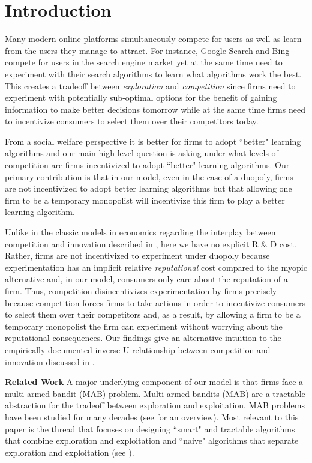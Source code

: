 \documentclass{article}
\theoremstyle{definition}
\begin{document}
\section{Introduction}
\label{S:1}

Many modern online platforms simultaneously compete for users as well as learn from the users they manage to attract. For instance, Google Search and Bing compete for users in the search engine market yet at the same time need to experiment with their search algorithms to learn what algorithms work the best. This creates a tradeoff between \textit{exploration} and \textit{competition} since firms need to experiment with potentially sub-optimal options for the benefit of gaining information to make better decisions tomorrow while at the same time firms need to incentivize consumers to select them over their competitors today.

From a social welfare perspective it is better for firms to adopt ``better" learning algorithms and our main high-level question is asking under what levels of competition are firms incentivized to adopt ``better" learning algorithms. Our primary contribution is that in our model, even in the case of a duopoly, firms are not incentivized to adopt better learning algorithms but that allowing one firm to be a temporary monopolist will incentivize this firm to play a better learning algorithm. 

Unlike in the classic models in economics regarding the interplay between competition and innovation described in \citet{barro2004economic}, here we have no explicit R \& D cost. Rather, firms are not incentivized to experiment under duopoly because experimentation has an implicit relative \textit{reputational} cost compared to the myopic alternative and, in our model, consumers only care about the reputation of a firm. Thus, competition disincentivizes experimentation by firms precisely because competition forces firms to take actions in order to incentivize consumers to select them over their competitors and, as a result, by allowing a firm to be a temporary monopolist the firm can experiment without worrying about the reputational consequences. Our findings give an alternative intuition to the empirically documented inverse-U relationship between competition and innovation discussed in \citet{aghion2005competition}.

\textbf{Related Work} A major underlying component of our model is that firms face a multi-armed bandit (MAB) problem. Multi-armed bandits (MAB) are a tractable abstraction for the tradeoff between exploration and exploitation. MAB problems have been studied for many decades (see \citet{bubeck2012regret} for an overview). Most relevant to this paper is the thread that focuses on designing ``smart" and tractable algorithms that combine exploration and exploitation and ``naive" algorithms that separate exploration and exploitation (see \citet{slivkins2017bandits}).
\end{document}
